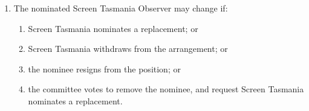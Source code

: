 \begin{enumerate}
\item The nominated Screen Tasmania Observer may change if:
\begin{enumerate}
\item Screen Tasmania nominates a replacement; or
\item Screen Tasmania withdraws from the arrangement; or
\item the nominee resigns from the position; or
\item the committee votes to remove the nominee, and request Screen Tasmania nominates a replacement.
\end{enumerate}
\end{enumerate}